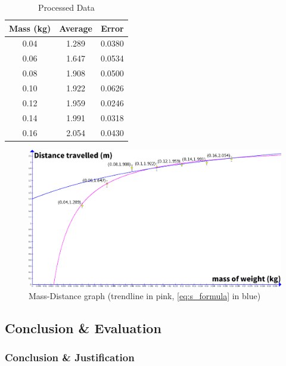 \documentclass[titlepage,12pt]{article}
\begin{document}
\FloatBarrier
\begin{table}[H]
    \centering
    \def\arraystretch{1.5}
    \begin{tabular}{c|c|c}
        Mass (kg) & Average & Error\\ 
        \hline
        \hline
        0.04 & 1.289 & 0.0380\\ 
        \hline
        0.06 & 1.647 & 0.0534\\ 
        \hline
        0.08 & 1.908 & 0.0500\\ 
        \hline
        0.10 & 1.922 & 0.0626\\ 
        \hline
        0.12 & 1.959 & 0.0246\\ 
        \hline
        0.14 & 1.991 & 0.0318\\ 
        \hline
        0.16 & 2.054 & 0.0430\\ 
    \end{tabular}
    \caption{Processed Data} 
    \label{table:processed data}
\end{table}

\begin{figure}[H]
    \label{fig:mass-distance-graph}
    \centering
    \includegraphics[scale=0.28]{mass-distance_graph}
    \caption{Mass-Distance graph (trendline in pink, 
        \autoref{eq:s_formula} in blue)}
\end{figure}

\FloatBarrier

\subsection{Conclusion \& Evaluation}

\subsubsection{Conclusion \& Justification}
\end{document}
